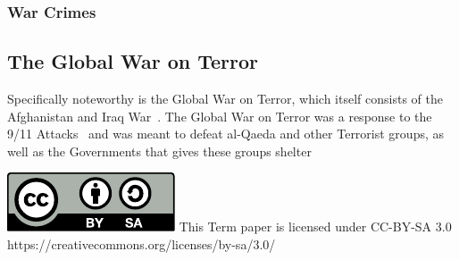 \documentclass[12pt,a4paper]{article}
\begin{document}
		\subsubsection{War Crimes}
		
		\subsection{The Global War on Terror}
		Specifically noteworthy is the Global War on Terror, which itself consists of the Afghanistan and Iraq War~\cite{gowt-bushlibrary}. 
		The Global War on Terror was a response to the 9/11 Attacks~\cite{gowt-hundred-days} and was meant to defeat al-Qaeda and other Terrorist groups, as well as the Governments that gives these groups shelter~\cite{gowt-bushlibrary}
	\newpage
	{
		{}
		
		\includegraphics{by-sa.pdf}
		This Term paper is licensed under CC-BY-SA 3.0\\
		https://creativecommons.org/licenses/by-sa/3.0/
	}
\end{document}
